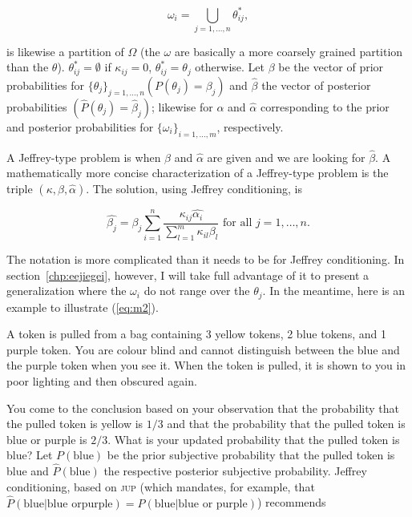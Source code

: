 \documentclass[phd,12pt,oneside]{ubcthesis}
\begin{document}
\begin{equation}
  \label{eq:m1}
  \omega_{i}=\bigcup_{j=1,\dots,n}\theta^{*}_{ij},
\end{equation}

{\noindent}is likewise a partition of $\Omega$ (the $\omega$ are
basically a more coarsely grained partition than the $\theta$).
$\theta^{*}_{ij}=\emptyset$ if $\kappa_{ij}=0$,
$\theta^{*}_{ij}=\theta_{j}$ otherwise. Let $\beta$ be the vector of
prior probabilities for $\{\theta_{j}\}_{j=1,\ldots,n}
(P(\theta_{j})=\beta_{j})$ and $\hat{\beta}$ the vector of posterior
probabilities $(\hat{P}(\theta_{j})=\hat{\beta}_{j})$; likewise for
$\alpha$ and $\hat{\alpha}$ corresponding to the prior and posterior
probabilities for $\{\omega_{i}\}_{i=1,\ldots,m}$, respectively.

A Jeffrey-type problem is when $\beta$ and $\hat{\alpha}$ are given
and we are looking for $\hat{\beta}$. A mathematically more concise
characterization of a Jeffrey-type problem is the triple
$(\kappa,\beta,\hat{\alpha})$. The solution, using Jeffrey
conditioning, is

\begin{equation}
  \label{eq:m2}
  \hat{\beta_{j}}=\beta_{j}\sum_{i=1}^{n}\frac{\kappa_{ij}\hat{\alpha_{i}}}{\sum_{l=1}^{m}\kappa_{il}\beta_{l}}\mbox{ for all }j=1,\ldots,n.
\end{equation}

{\noindent}The notation is more complicated than it needs to be for Jeffrey
conditioning. In section~\ref{chp:eejiegei}, however, I will take
full advantage of it to present a generalization where the
$\omega_{i}$ do not range over the $\theta_{j}$. In the meantime, here
is an example to illustrate (\ref{eq:m2}).

\begin{quotex}
  \label{ex:colblind} A token is pulled from a
  bag containing 3 yellow tokens, 2 blue tokens, and 1 purple token.
  You are colour blind and cannot distinguish between the blue and the
  purple token when you see it. When the token is pulled, it is shown
  to you in poor lighting and then obscured again. 
\end{quotex}

{\noindent}You come to the conclusion based on your observation that
the probability that the pulled token is yellow is $1/3$ and that the
probability that the pulled token is blue or purple is $2/3$. What is
your updated probability that the pulled token is blue? Let
$P(\mbox{blue})$ be the prior subjective probability that the pulled
token is blue and $\hat{P}(\mbox{blue})$ the respective posterior
subjective probability. Jeffrey conditioning, based on \textsc{jup}
(which mandates, for example, that
$\hat{P}(\mbox{blue}|\mbox{blue or}\mbox{
  purple})=P(\mbox{blue}|\mbox{blue or purple})$) recommends
\end{document}

